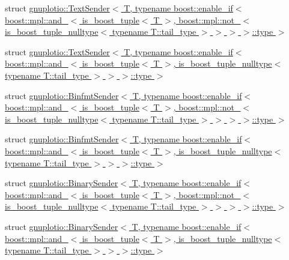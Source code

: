 \begin{DoxyCompactItemize}
\item 
struct \hyperlink{structgnuplotio_1_1_text_sender_3_01_t_00_01typename_01boost_1_1enable__if_3_01boost_1_1mpl_1_1ad1ac3a3da167856c52be6ae54ba2c114}{gnuplotio\+::\+Text\+Sender$<$ T, typename boost\+::enable\+\_\+if$<$ boost\+::mpl\+::and\+\_\+$<$ is\+\_\+boost\+\_\+tuple$<$ T $>$, boost\+::mpl\+::not\+\_\+$<$ is\+\_\+boost\+\_\+tuple\+\_\+nulltype$<$ typename T\+::tail\+\_\+type $>$ $>$ $>$ $>$\+::type $>$}
\item 
struct \hyperlink{structgnuplotio_1_1_text_sender_3_01_t_00_01typename_01boost_1_1enable__if_3_01boost_1_1mpl_1_1ab6d6864cc1b3ed233c9f15134694f953}{gnuplotio\+::\+Text\+Sender$<$ T, typename boost\+::enable\+\_\+if$<$ boost\+::mpl\+::and\+\_\+$<$ is\+\_\+boost\+\_\+tuple$<$ T $>$, is\+\_\+boost\+\_\+tuple\+\_\+nulltype$<$ typename T\+::tail\+\_\+type $>$ $>$ $>$\+::type $>$}
\item 
struct \hyperlink{structgnuplotio_1_1_binfmt_sender_3_01_t_00_01typename_01boost_1_1enable__if_3_01boost_1_1mpl_1_e9270e5cb86823566a0af3940aa51061}{gnuplotio\+::\+Binfmt\+Sender$<$ T, typename boost\+::enable\+\_\+if$<$ boost\+::mpl\+::and\+\_\+$<$ is\+\_\+boost\+\_\+tuple$<$ T $>$, boost\+::mpl\+::not\+\_\+$<$ is\+\_\+boost\+\_\+tuple\+\_\+nulltype$<$ typename T\+::tail\+\_\+type $>$ $>$ $>$ $>$\+::type $>$}
\item 
struct \hyperlink{structgnuplotio_1_1_binfmt_sender_3_01_t_00_01typename_01boost_1_1enable__if_3_01boost_1_1mpl_1_8c86f170c2e2969f5519817e5c367132}{gnuplotio\+::\+Binfmt\+Sender$<$ T, typename boost\+::enable\+\_\+if$<$ boost\+::mpl\+::and\+\_\+$<$ is\+\_\+boost\+\_\+tuple$<$ T $>$, is\+\_\+boost\+\_\+tuple\+\_\+nulltype$<$ typename T\+::tail\+\_\+type $>$ $>$ $>$\+::type $>$}
\item 
struct \hyperlink{structgnuplotio_1_1_binary_sender_3_01_t_00_01typename_01boost_1_1enable__if_3_01boost_1_1mpl_1_916ff7a758aa0b8917fd3b30ff275f06}{gnuplotio\+::\+Binary\+Sender$<$ T, typename boost\+::enable\+\_\+if$<$ boost\+::mpl\+::and\+\_\+$<$ is\+\_\+boost\+\_\+tuple$<$ T $>$, boost\+::mpl\+::not\+\_\+$<$ is\+\_\+boost\+\_\+tuple\+\_\+nulltype$<$ typename T\+::tail\+\_\+type $>$ $>$ $>$ $>$\+::type $>$}
\item 
struct \hyperlink{structgnuplotio_1_1_binary_sender_3_01_t_00_01typename_01boost_1_1enable__if_3_01boost_1_1mpl_1_29e1098ca8b7afc20f2ca0bc2e79506a}{gnuplotio\+::\+Binary\+Sender$<$ T, typename boost\+::enable\+\_\+if$<$ boost\+::mpl\+::and\+\_\+$<$ is\+\_\+boost\+\_\+tuple$<$ T $>$, is\+\_\+boost\+\_\+tuple\+\_\+nulltype$<$ typename T\+::tail\+\_\+type $>$ $>$ $>$\+::type $>$}

\end{DoxyCompactItemize}
